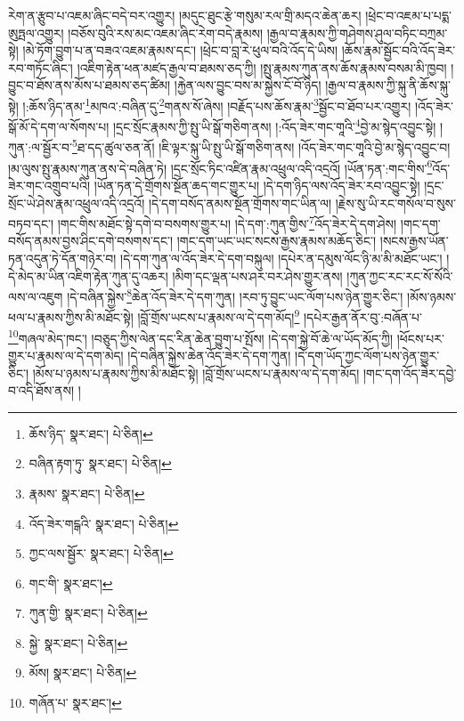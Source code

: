 རེག་ན་རྩུབ་པ་འཇམ་ཞིང་བདེ་བར་འགྱུར། །མདུང་ཐུང་རྩེ་གསུམ་རལ་གྲི་མདའ་ཆེན་ཆར། །ཕྲེང་བ་འཇམ་པ་པདྨ་ཨུཏྤལ་འགྱུར། །བཅོས་བུའི་རས་མང་འཇམ་ཞིང་རེག་བདེ་རྣམས། །རྒྱལ་བ་རྣམས་ཀྱི་གཤེགས་ཤུལ་བཏིང་བཀྲམ་སྟེ། །མེ་ཏོག་བྱུག་པ་ན་བཟའ་འཇམ་རྣམས་དང་། །ཕྲེང་བ་བླ་རེ་ཕུལ་བའི་འོད་དེ་ཡིས། །ཆོས་རྣམ་སྦྱོང་བའི་འོད་ཟེར་རབ་གཏོང་ཞིང་། །འཇིག་རྟེན་ཕན་མཛད་རྒྱལ་བ་ཐམས་ཅད་ཀྱི། །སྤུ་རྣམས་ཀུན་ནས་ཆོས་རྣམས་བསམ་མི་ཁྱབ། །བྱུང་བ་ཐོས་ནས་མོས་པ་ཐམས་ཅད་ཚིམ། །རྐྱེན་ལས་བྱུང་བས་མ་སྐྱེས་ངོ་བོ་ཉིད། །རྒྱལ་བ་རྣམས་ཀྱི་སྐུ་ནི་ཆོས་སྐུ་སྟེ། །:ཆོས་ཉིད་ནམ་\footnote{ཆོས་ཉིད་  སྣར་ཐང་།  པེ་ཅིན། }མཁའ་:བཞིན་དུ་\footnote{བཞིན་རྟག་ཏུ་  སྣར་ཐང་།  པེ་ཅིན། }གནས་སོ་ཞེས། །བརྗོད་པས་ཆོས་རྣམ་\footnote{རྣམས་  སྣར་ཐང་།  པེ་ཅིན། }སྦྱོང་བ་ཐོབ་པར་འགྱུར། །འོད་ཟེར་སྒོ་མོ་དེ་དག་ལ་སོགས་པ། །དྲང་སྲོང་རྣམས་ཀྱི་སྤུ་ཡི་སྒོ་གཅིག་ནས། །:འོད་ཟེར་གང་གཱའི་\footnote{འོད་ཟེར་གངྒའི་  སྣར་ཐང་།  པེ་ཅིན། }བྱེ་མ་སྙེད་འབྱུང་སྟེ། །ཀུན་:ལ་སྦྱོར་བ་\footnote{ཀྱང་ལས་སྦྱོར་  སྣར་ཐང་།  པེ་ཅིན། }ཐ་དད་ཚུལ་ཅན་ནོ། །ཇི་ལྟར་སྐུ་ཡི་སྤུ་ཡི་སྒོ་གཅིག་ནས། །འོད་ཟེར་གང་གཱའི་བྱེ་མ་སྙེད་འབྱུང་བ། །མ་ལུས་སྤུ་རྣམས་ཀུན་ནས་དེ་བཞིན་ཏེ། །དྲང་སྲོང་ཏིང་འཛིན་རྣམ་འཕྲུལ་འདི་འདྲའོ། །ཡོན་ཏན་:གང་གིས་\footnote{གང་གི་  སྣར་ཐང་། }འོད་ཟེར་གང་འགྲུབ་པའི། །ཡོན་ཏན་དེ་གྲོགས་སྔོན་ཆད་གང་གྱུར་པ། །དེ་དག་ཉིད་ལས་འོད་ཟེར་རབ་འབྱུང་སྟེ། །དྲང་སྲོང་ཡེ་ཤེས་རྣམ་འཕྲུལ་འདི་འདྲའོ། །དེ་དག་བསོད་ནམས་སྔོན་གྲོགས་གང་ཡིན་ལ། །རྗེས་སུ་ཡི་རང་གསོལ་བ་སུས་བཏབ་དང་། །གང་གིས་མཐོང་སྟེ་དགེ་བ་བསགས་གྱུར་པ། །དེ་དག་:ཀུན་གྱིས་\footnote{ཀུན་གྱི་  སྣར་ཐང་།  པེ་ཅིན། }འོད་ཟེར་དེ་དག་ཤེས། །གང་དག་བསོད་ནམས་བྱས་ཤིང་དགེ་བསགས་དང་། །གང་དག་ཡང་ཡང་སངས་རྒྱས་རྣམས་མཆོད་ཅིང་། །སངས་རྒྱས་ཡོན་ཏན་འདུན་ཏེ་དོན་གཉེར་བ། །དེ་དག་ཀུན་ལ་འོད་ཟེར་དེ་དག་བསྐུལ། །དཔེར་ན་དམུས་ལོང་ཉི་མ་མི་མཐོང་ཡང་། །དེ་མེད་མ་ཡིན་འཇིག་རྟེན་ཀུན་དུ་འཆར། །མིག་དང་ལྡན་པས་ཤར་བར་ཤེས་གྱུར་ནས། །ཀུན་ཀྱང་རང་རང་སོ་སོའི་ལས་ལ་འཇུག །དེ་བཞིན་སྐྱེས་\footnote{སྐྱེ་  སྣར་ཐང་།  པེ་ཅིན། }ཆེན་འོད་ཟེར་དེ་དག་ཀུན། །རབ་ཏུ་བྱུང་ཡང་ལོག་པས་ཉེན་གྱུར་ཅིང་། །མོས་ཉམས་ཕལ་པ་རྣམས་ཀྱིས་མི་མཐོང་སྟེ། །བློ་གྲོས་ཡངས་པ་རྣམས་ལ་དེ་དག་མོད།\footnote{མོས།  སྣར་ཐང་།  པེ་ཅིན། } །དཔེར་རྒྱན་ནོར་བུ་:བཞོན་པ་\footnote{གཞོན་པ་  སྣར་ཐང་། }གཞལ་མེད་ཁང་། །བཅུད་ཀྱིས་ལེན་དང་རིན་ཆེན་བྱུག་པ་སྤོས། །དེ་དག་སྐྱེ་བོ་ཆེ་ལ་ཡོད་མོད་ཀྱི། །ཕོངས་པར་གྱུར་པ་རྣམས་ལ་དེ་དག་མེད། །དེ་བཞིན་སྐྱེས་ཆེན་འོད་ཟེར་དེ་དག་ཀུན། །དེ་དག་ཡོད་ཀྱང་ལོག་པས་ཉེན་གྱུར་ཅིང་། །མོས་པ་ཉམས་པ་རྣམས་ཀྱིས་མི་མཐོང་སྟེ། །བློ་གྲོས་ཡངས་པ་རྣམས་ལ་དེ་དག་མོད། །གང་དག་འོད་ཟེར་དབྱེ་བ་འདི་ཐོས་ནས། །
